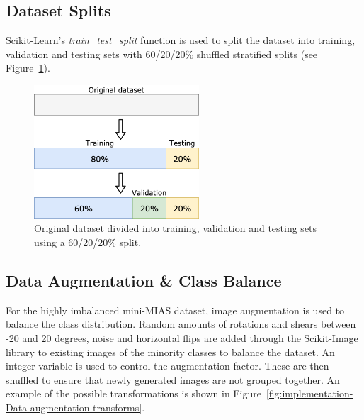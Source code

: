 
\subsection{Dataset Splits}

Scikit-Learn's \textit{train\_test\_split} function is used to split the dataset into training, validation and testing sets with 60/20/20\% shuffled stratified splits (see Figure~\ref{fig:dataset_splits}).

\begin{figure}[ht]
\centerline{\includegraphics[width=0.55\textwidth]{figures/implementation/dataset_splits.png}}
\caption{\label{fig:dataset_splits}Original dataset divided into training, validation and testing sets using a 60/20/20\% split.}
\end{figure}


\subsection{Data Augmentation \& Class Balance}
\label{sec:implementation-data-augmentation-class-balance}

For the highly imbalanced mini-MIAS dataset, image augmentation is used to balance the class distribution. Random amounts of rotations and shears between -20 and 20 degrees, noise and horizontal flips are added through the Scikit-Image library to existing images of the minority classes to balance the dataset. An integer variable is used to control the augmentation factor. These are then shuffled to ensure that newly generated images are not grouped together. An example of the possible transformations is shown in Figure~\ref{fig:implementation-Data augmentation transforms}.\\

